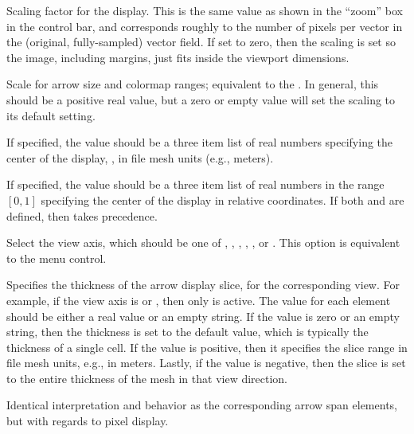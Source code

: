\begin{description}
 Scaling factor for the display.  This is the same value as shown in the
 ``zoom'' box in the  control bar,
 and corresponds roughly to the number of pixels per vector in the
 (original, fully-sampled) vector field.  If set to zero, then
 the scaling is set so the image, including margins, just fits inside
 the viewport dimensions.
\item[\optkey{misc,datascale}]
 Scale for arrow size and colormap ranges; equivalent to the
 .  In general,
 this should be a positive real value, but a zero or empty value will
 set the scaling to its default setting.
\item[\optkey{misc,centerpt}]
 If specified, the value should be a three item list of real numbers
 specifying the center of the display, , in
 file mesh units (e.g., meters).
\item[\optkey{misc,relcenterpt}]
 If specified, the value should be a three item list of real numbers in
 the range $[0,1]$ specifying the center of the display in relative
 coordinates.  If both  and  are
 defined, then  takes precedence.
\item[\optkey{viewaxis}]
 Select the view axis, which should be one of , , ,
 , , or .  This option is equivalent to the
  menu control.
\item[\optkey{viewaxis,xarrowspan}, \optkey{viewaxis,yarrowspan},
      \optkey{viewaxis,zarrowspan}]
 Specifies the thickness of the arrow display slice, for the
 corresponding view.  For example, if the view axis is  or
 , then only  is active.  The value
 for each element should be either a real value or an empty string.  If
 the value is zero or an empty string, then the thickness is set to the
 default value, which is typically the thickness of a single cell.  If
 the value is positive, then it specifies the slice range in file mesh
 units, e.g., in meters.  Lastly, if the value is negative, then the
 slice is set to the entire thickness of the mesh in that view
 direction.
\item[\optkey{viewaxis,xpixelspan}, \optkey{viewaxis,ypixelspan},
      \optkey{viewaxis,zpixelspan}]
 Identical interpretation and behavior as the corresponding arrow span
 elements, but with regards to pixel display.
\end{description}


